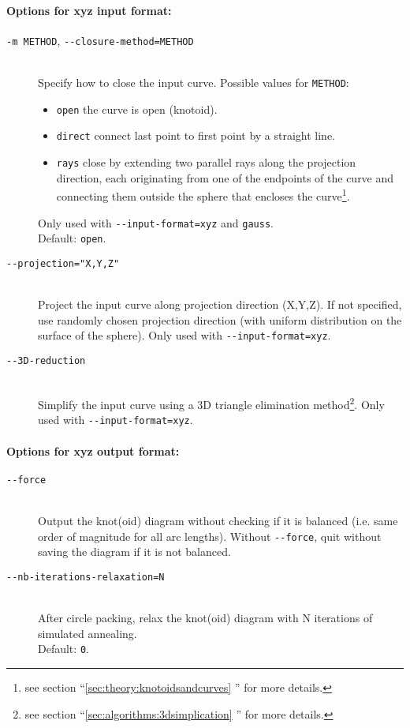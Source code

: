 \paragraph{Options for xyz input format:}
\begin{description}
\item[\lstinline{-m METHOD}, \lstinline{--closure-method=METHOD}]\hfill\\
  Specify how to close the input curve. Possible values for \lstinline{METHOD}:
  \begin{itemize}
  \item \lstinline{open} the curve is open (knotoid).
  \item \lstinline{direct} connect last point to first point by a straight line.
  \item \lstinline{rays} close by extending two parallel rays along the projection direction, each originating from one of the endpoints of the curve and connecting them outside the sphere that encloses the curve\footnote{see section ``\ref{sec:theory:knotoidsandcurves} '' for more details.}.
  \end{itemize}
  Only used with \lstinline{--input-format=xyz} and \lstinline{gauss}.\\
  Default: \lstinline{open}.  
\item[\lstinline{--projection="X,Y,Z"}]\hfill\\
  Project the input curve along projection direction (X,Y,Z). If not specified, use randomly chosen projection direction (with uniform distribution on the surface of the sphere). Only used with \lstinline{--input-format=xyz}.
\item[\lstinline{--3D-reduction}]\hfill\\
  Simplify the input curve using a 3D triangle elimination method\footnote{see section  ``\ref{sec:algorithms:3dsimplication} '' for more details.}. Only used with \lstinline{--input-format=xyz}.
\end{description}
\paragraph{Options for xyz output format:}
\begin{description}
\item[\lstinline{--force}]\hfill\\
  Output the knot(oid) diagram without checking if it is balanced (i.e. same order of magnitude for all arc lengths).
  Without \lstinline{--force}, quit without saving the diagram if it is not balanced.
\item[\lstinline{--nb-iterations-relaxation=N}]\hfill\\
  After circle packing, relax the knot(oid) diagram with N iterations of simulated annealing.\\
  Default: \lstinline{0}.  
\end{description}


